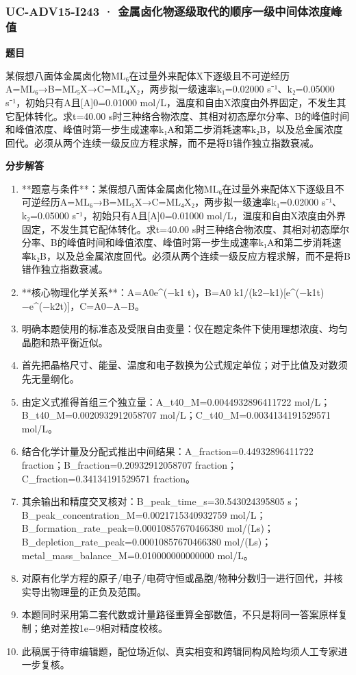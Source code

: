 \documentclass[UTF8,11pt,a4paper]{ctexart}
\begin{document}
\subsubsection*{UC-ADV15-I243 · 金属卤化物逐级取代的顺序一级中间体浓度峰值}
\noindent\textbf{题目}\par
某假想八面体金属卤化物ML₆在过量外来配体X下逐级且不可逆经历A=ML₆→B=ML₅X→C=ML₄X₂，两步拟一级速率k₁=0.02000 s⁻¹、k₂=0.05000 s⁻¹，初始只有A且[A]0=0.01000 mol/L，温度和自由X浓度由外界固定，不发生其它配体转化。求t=40.00 s时三种络合物浓度、其相对初态摩尔分率、B的峰值时间和峰值浓度、峰值时第一步生成速率k₁A和第二步消耗速率k₂B，以及总金属浓度回代。必须从两个连续一级反应方程求解，而不是将B错作独立指数衰减。\par
\medskip\noindent\textbf{分步解答}
\begin{enumerate}
\item **题意与条件**：某假想八面体金属卤化物ML₆在过量外来配体X下逐级且不可逆经历A=ML₆→B=ML₅X→C=ML₄X₂，两步拟一级速率k₁=0.02000 s⁻¹、k₂=0.05000 s⁻¹，初始只有A且[A]0=0.01000 mol/L，温度和自由X浓度由外界固定，不发生其它配体转化。求t=40.00 s时三种络合物浓度、其相对初态摩尔分率、B的峰值时间和峰值浓度、峰值时第一步生成速率k₁A和第二步消耗速率k₂B，以及总金属浓度回代。必须从两个连续一级反应方程求解，而不是将B错作独立指数衰减。
\item **核心物理化学关系**：A=A0e\textasciicircum{}(−k1 t)，B=A0 k1/(k2−k1)[e\textasciicircum{}(−k1t)−e\textasciicircum{}(−k2t)]，C=A0−A−B。
\item 明确本题使用的标准态及受限自由变量：仅在题定条件下使用理想浓度、均匀晶胞和热平衡近似。
\item 首先把晶格尺寸、能量、温度和电子数换为公式规定单位；对于比值及对数须先无量纲化。
\item 由定义式推得首组三个独立量：A\_t40\_M=0.0044932896411722 mol/L；B\_t40\_M=0.0020932912058707 mol/L；C\_t40\_M=0.0034134191529571 mol/L。
\item 结合化学计量及分配式推出中间结果：A\_fraction=0.44932896411722 fraction；B\_fraction=0.20932912058707 fraction；C\_fraction=0.34134191529571 fraction。
\item 其余输出和精度交叉核对：B\_peak\_time\_s=30.543024395805 s；B\_peak\_concentration\_M=0.0021715340932759 mol/L；B\_formation\_rate\_peak=0.00010857670466380 mol/(Ls)；B\_depletion\_rate\_peak=0.00010857670466380 mol/(Ls)；metal\_mass\_balance\_M=0.010000000000000 mol/L。
\item 对原有化学方程的原子/电子/电荷守恒或晶胞/物种分数归一进行回代，并核实导出物理量的正负及范围。
\item 本题同时采用第二套代数或计量路径重算全部数值，不只是将同一答案原样复制；绝对差按1e−9相对精度校核。
\item 此稿属于待审编辑题，配位场近似、真实相变和跨辑同构风险均须人工专家进一步复核。
\end{enumerate}
\end{document}
